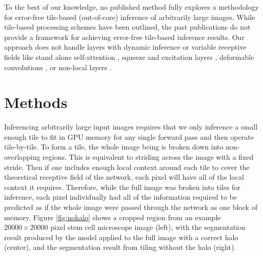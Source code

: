 \documentclass[runningheads]{llncs}
\begin{document}
To the best of our knowledge, no published method fully explores a methodology for error-free tile-based (out-of-core) inference of arbitrarily large images. While tile-based processing schemes have been outlined, the past publications do not provide a framework for achieving error-free tile-based inference results. Our approach does not handle layers with dynamic inference or variable receptive fields like stand alone self-attention \cite{Ramachandran2019b}, squeeze and excitation layers \cite{Hu2018}, deformable convolutions \cite{Dai2017}, or non-local layers \cite{Wang2018c}. 


\section{Methods}
\label{methods}

Inferencing arbitrarily large input images requires that we only inference a small enough tile to fit in GPU memory for any single forward pass and then operate tile-by-tile. To form a tile, the whole image being is broken down into non-overlapping regions. This is equivalent to striding across the image with a fixed stride. Then if one includes enough local context around each tile to cover the theoretical receptive field of the network, each pixel will have all of the local context it requires. Therefore, while the full image was broken into tiles for inference, each pixel individually had all of the information required to be predicted as if the whole image were passed through the network as one block of memory. Figure \ref{fig:nohalo} shows a cropped region from an example $\num{20000} \times \num{20000}$ pixel stem cell microscope image (left), with the segmentation result produced by the model applied to the full image with a correct halo (center), and the segmentation result from tiling without the halo (right). 
\end{document}
